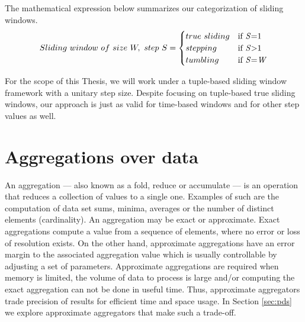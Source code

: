 The mathematical expression below summarizes our categorization of sliding windows.
\begin{equation} 
\label{math:windows}
  Sliding\ window \,\, of \,\, size \,\, W, \,\, step \,\, S =
    \begin{cases}
      true \,\, sliding & \text{if \textit{S}=1}\\
      stepping & \text{if \textit{S}>1}\\
      tumbling & \text{if \textit{S}=\textit{W}}
    \end{cases}
\end{equation}

For the scope of this Thesis, we will work under a tuple-based sliding window framework with a unitary step size. Despite focusing on tuple-based true sliding windows, our approach is just as valid for time-based windows and for other step values as well.

\section{Aggregations over data} \label{sec:aggregations}

An aggregation --- also known as a fold, reduce or accumulate --- is an operation that reduces a collection of values to a single one. Examples of such are the computation of data set sums, minima, averages or the number of distinct elements (cardinality). An aggregation may be exact or approximate. Exact aggregations compute a value from a sequence of elements, where no error or loss of resolution exists. On the other hand, approximate aggregations have an error margin to the associated aggregation value which is usually controllable by adjusting a set of parameters. 
Approximate aggregations are required when memory is limited, the volume of data to process is large and/or computing the exact aggregation can not be done in useful time. Thus, approximate aggregators trade precision of results for efficient time and space usage. In Section \ref{sec:pds} we explore approximate aggregators that make such a trade-off.

